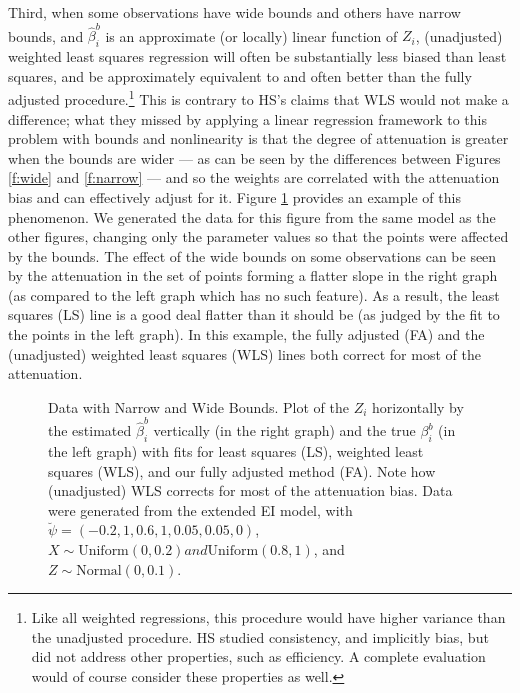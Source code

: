 \documentclass[11pt,titlepage]{article}
\begin{document}
Third, when some observations have wide bounds and others have narrow
bounds, and $\hat\beta_i^b$ is an approximate (or locally) linear
function of $Z_i$, (unadjusted) weighted least squares regression will
often be substantially less biased than least squares, and be
approximately equivalent to and often better than the fully adjusted
procedure.\footnote{Like all weighted regressions, this procedure
  would have higher variance than the unadjusted procedure. HS studied
  consistency, and implicitly bias, but did not address other
  properties, such as efficiency.  A complete evaluation would of
  course consider these properties as well.}  This is contrary to HS's
claims that WLS would not make a difference; what they missed by
applying a linear regression framework to this problem with bounds and
nonlinearity is that the degree of attenuation is greater when the
bounds are wider --- as can be seen by the differences between Figures
\ref{f:wide} and \ref{f:narrow} --- and so the weights are correlated
with the attenuation bias and can effectively adjust for it.  Figure
\ref{f:mixed} provides an example of this phenomenon.  We generated
the data for this figure from the same model as the other figures,
changing only the parameter values so that the points were affected by
the bounds.  The effect of the wide bounds on some observations can be
seen by the attenuation in the set of points forming a flatter slope
in the right graph (as compared to the left graph which has no such
feature).  As a result, the least squares (LS) line is a good deal
flatter than it should be (as judged by the fit to the points in the
left graph).  In this example, the fully adjusted (FA) and the
(unadjusted) weighted least squares (WLS) lines both correct for most
of the attenuation.
\begin{figure}[t]
  \begin{center}
    \caption{Data with Narrow and Wide Bounds. Plot of the $Z_i$ 
      horizontally by the estimated $\hat\beta_i^b$ vertically (in the
      right graph) and the true $\beta_i^b$ (in the left graph) with
      fits for least squares (LS), weighted least squares (WLS), and
      our fully adjusted method (FA).  Note how (unadjusted) WLS
      corrects for most of the attenuation bias.  Data were generated
      from the extended EI model, with
      $\breve\psi=(-0.2,1,0.6,1,0.05,0.05,0)$, $X \sim
      \textrm{Uniform}(0,0.2) and \textrm{Uniform}(0.8,1)$, and $Z
      \sim \textrm{Normal}(0,0.1)$.}
    \label{f:mixed}
  \end{center}
\end{figure}
\end{document}
